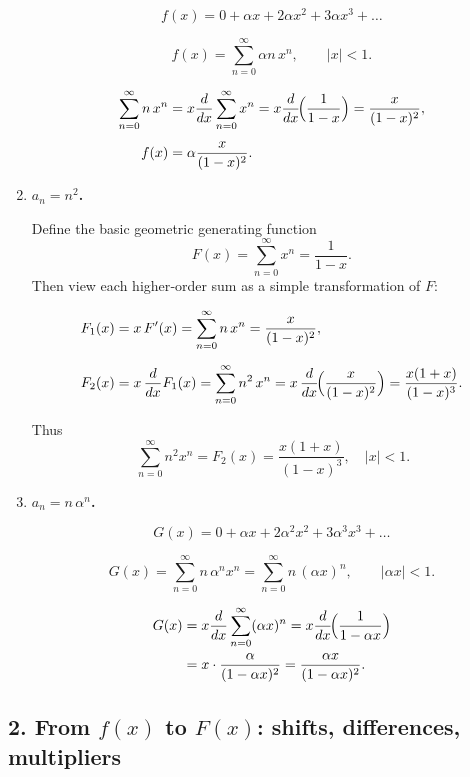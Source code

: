 \documentclass[docmute]{article}
\begin{document}
\begin{enumerate}[label=\textbf{1(\alph*)}\quad]
\[
f(x)=0+\alpha x+2\alpha x^{2}+3\alpha x^{3}+\dots
\]

\[
f(x)=\sum_{n=0}^{\infty}\alpha n\,x^{n},\qquad |x|<1.
\]

\[
\begin{aligned}
\sum_{n=0}^{\infty}n\,x^{n}
      &=x\frac{d}{dx}\sum_{n=0}^{\infty}x^{n}
       =x\frac{d}{dx}\!\Bigl(\frac{1}{1-x}\Bigr)
       =\frac{x}{(1-x)^{2}},\\[4pt]
f(x)  &=\alpha\frac{x}{(1-x)^{2}}.
\end{aligned}
\]

\medskip
\item \textbf{$a_{n}=n^{2}$.}

Define the basic geometric generating function
\[
F(x)=\sum_{n=0}^\infty x^n=\frac1{1-x}.
\]
Then view each higher‐order sum as a simple transformation of \(F\):

\[
\begin{aligned}
F_1(x)&=x\,F'(x)
        =\sum_{n=0}^\infty n\,x^n
        =\frac{x}{(1-x)^2},\\[6pt]
F_2(x)&=x\,\frac{d}{dx}F_1(x)
        =\sum_{n=0}^\infty n^2\,x^n
        =x\,\frac{d}{dx}\!\Bigl(\frac{x}{(1-x)^2}\Bigr)
        =\frac{x(1+x)}{(1-x)^3}.
\end{aligned}
\]

Thus
\[
\boxed{\,\sum_{n=0}^\infty n^2 x^n
    =F_2(x)
    =\frac{x(1+x)}{(1-x)^3},\quad |x|<1.}
\]

\medskip
\item \textbf{$a_{n}=n\,\alpha^{n}$.}

\[
G(x)=0+\alpha x+2\alpha^{2}x^{2}+3\alpha^{3}x^{3}+\dots
\]

\[
G(x)=\sum_{n=0}^{\infty}n\,\alpha^{n}x^{n}
      =\sum_{n=0}^{\infty}n\,(\alpha x)^{n},\qquad |\alpha x|<1.
\]

\[
\begin{aligned}
G(x)
  &=x\frac{d}{dx}\sum_{n=0}^{\infty}(\alpha x)^{n}
   =x\frac{d}{dx}\!\Bigl(\frac{1}{1-\alpha x}\Bigr)\\
  &=x\cdot\frac{\alpha}{(1-\alpha x)^{2}}
   =\frac{\alpha x}{(1-\alpha x)^{2}}.
\end{aligned}
\]

\end{enumerate}

\subsection*{2. From $f(x)$ to $F(x)$: shifts, differences, multipliers}
\end{document}
